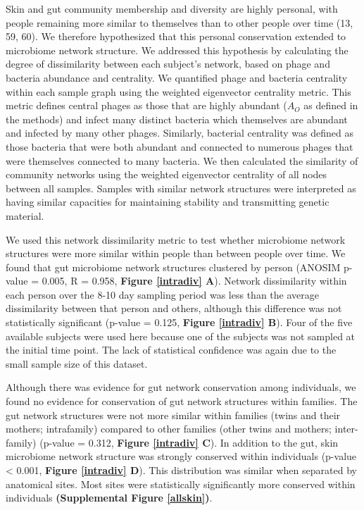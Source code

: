 \documentclass[12pt,]{article}
\begin{document}
Skin and gut community membership and diversity are highly personal,
with people remaining more similar to themselves than to other people
over time (13, 59, 60). We therefore hypothesized that this personal
conservation extended to microbiome network structure. We addressed this
hypothesis by calculating the degree of dissimilarity between each
subject's network, based on phage and bacteria abundance and centrality.
We quantified phage and bacteria centrality within each sample graph
using the weighted eigenvector centrality metric. This metric defines
central phages as those that are highly abundant (\(A_{O}\) as defined
in the methods) and infect many distinct bacteria which themselves are
abundant and infected by many other phages. Similarly, bacterial
centrality was defined as those bacteria that were both abundant and
connected to numerous phages that were themselves connected to many
bacteria. We then calculated the similarity of community networks using
the weighted eigenvector centrality of all nodes between all samples.
Samples with similar network structures were interpreted as having
similar capacities for maintaining stability and transmitting genetic
material.

We used this network dissimilarity metric to test whether microbiome
network structures were more similar within people than between people
over time. We found that gut microbiome network structures clustered by
person (ANOSIM p-value = 0.005, R = 0.958, \textbf{Figure \ref{intradiv}
A}). Network dissimilarity within each person over the 8-10 day sampling
period was less than the average dissimilarity between that person and
others, although this difference was not statistically significant
(p-value = 0.125, \textbf{Figure \ref{intradiv} B}). Four of the five
available subjects were used here because one of the subjects was not
sampled at the initial time point. The lack of statistical confidence
was again due to the small sample size of this dataset.

Although there was evidence for gut network conservation among
individuals, we found no evidence for conservation of gut network
structures within families. The gut network structures were not more
similar within families (twins and their mothers; intrafamily) compared
to other families (other twins and mothers; inter-family) (p-value =
0.312, \textbf{Figure \ref{intradiv} C}). In addition to the gut, skin
microbiome network structure was strongly conserved within individuals
(p-value \textless{} 0.001, \textbf{Figure \ref{intradiv} D}). This
distribution was similar when separated by anatomical sites. Most sites
were statistically significantly more conserved within individuals
\textbf{(Supplemental Figure \ref{allskin})}.
\end{document}
